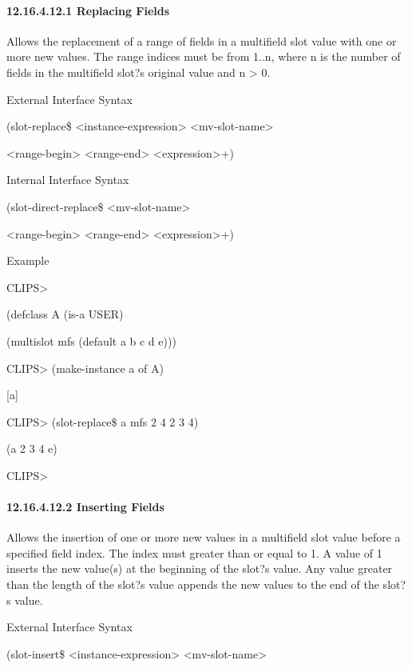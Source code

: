 \documentclass[letterpaper,10pt,english]{sphinxmanual}
\begin{document}
\paragraph{12.16.4.12.1 Replacing Fields}
\label{\detokenize{actions:replacing-fields}}
Allows the replacement of a range of fields in a multifield slot value
with one or more new values. The range indices must be from 1..n, where
n is the number of fields in the multifield slot?s original value and n
\textgreater{} 0.

External Interface Syntax

(slot-replace\$ \textless{}instance-expression\textgreater{} \textless{}mv-slot-name\textgreater{}

\textless{}range-begin\textgreater{} \textless{}range-end\textgreater{} \textless{}expression\textgreater{}+)

Internal Interface Syntax

(slot-direct-replace\$ \textless{}mv-slot-name\textgreater{}

\textless{}range-begin\textgreater{} \textless{}range-end\textgreater{} \textless{}expression\textgreater{}+)

Example

CLIPS\textgreater{}

(defclass A (is-a USER)

(multislot mfs (default a b c d e)))

CLIPS\textgreater{} (make-instance a of A)

{[}a{]}

CLIPS\textgreater{} (slot-replace\$ a mfs 2 4 2 3 4)

(a 2 3 4 e)

CLIPS\textgreater{}


\paragraph{12.16.4.12.2 Inserting Fields}
\label{\detokenize{actions:inserting-fields}}
Allows the insertion of one or more new values in a multifield slot
value before a specified field index. The index must greater than or
equal to 1. A value of 1 inserts the new value(s) at the beginning of
the slot?s value. Any value greater than the length of the slot?s value
appends the new values to the end of the slot?s value.

External Interface Syntax

(slot-insert\$ \textless{}instance-expression\textgreater{} \textless{}mv-slot-name\textgreater{}
\end{document}
